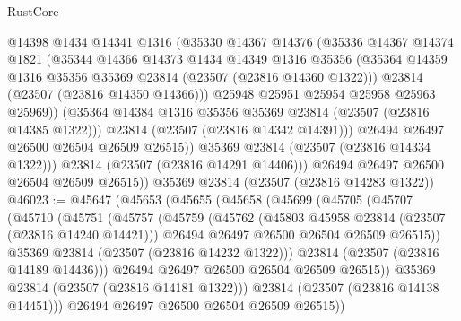 \begin{lexlean}{RustCore}
\begin{coremodule}
                  @14398
                  @1434
                  @14341
                  @1316
                  (@35330
                    @14367
                    @14376
                    (@35336
                      @14367
                      @14374
                      @1821
                      (@35344
                        @14366
                        @14373
                        @1434
                        @14349
                        @1316
                        @35356
                        (@35364 @14359 @1316 @35356 @35369 @23814 (@23507 (@23816 @14360 @1322)))
                        @23814
                        (@23507 (@23816 @14350 @14366)))
                      @25948
                      @25951
                      @25954
                      @25958
                      @25963
                      @25969))
                  (@35364 @14384 @1316 @35356 @35369 @23814 (@23507 (@23816 @14385 @1322)))
                  @23814
                  (@23507 (@23816 @14342 @14391)))
                @26494
                @26497
                @26500
                @26504
                @26509
                @26515))
            @35369
            @23814
            (@23507 (@23816 @14334 @1322)))
          @23814
          (@23507 (@23816 @14291 @14406)))
        @26494
        @26497
        @26500
        @26504
        @26509
        @26515))
    @35369
    @23814
    (@23507 (@23816 @14283 @1322))
@46023 := @45647
    (@45653
      (@45655
        (@45658
          (@45699
            (@45705
              (@45707
                (@45710
                  (@45751
                    (@45757
                      (@45759
                        (@45762
                          (@45803 @45958 @23814 (@23507 (@23816 @14240 @14421)))
                          @26494
                          @26497
                          @26500
                          @26504
                          @26509
                          @26515))
                      @35369
                      @23814
                      (@23507 (@23816 @14232 @1322)))
                    @23814
                    (@23507 (@23816 @14189 @14436)))
                  @26494
                  @26497
                  @26500
                  @26504
                  @26509
                  @26515))
              @35369
              @23814
              (@23507 (@23816 @14181 @1322)))
            @23814
            (@23507 (@23816 @14138 @14451)))
          @26494
          @26497
          @26500
          @26504
          @26509
          @26515))

\end{coremodule}
\end{lexlean}
